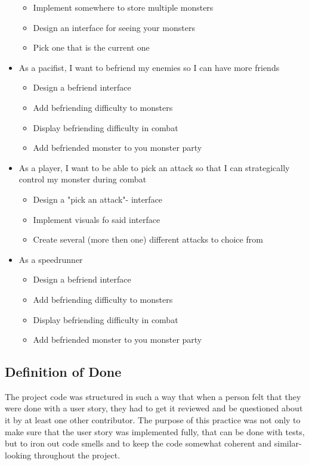 \begin{itemize}
	      \begin{itemize}[+]
		      \item Implement somewhere to store multiple monsters
		      \item Design an interface for seeing your monsters
		      \item Pick one that is the current one
	      \end{itemize}
	\item As a pacifist, I want to befriend my enemies so I can have more friends
	      \begin{itemize}[+]
		      \item Design a befriend interface
		      \item Add befriending difficulty to monsters
		      \item Display befriending difficulty in combat
		      \item Add befriended monster to you monster party
	      \end{itemize}
	\item As a player, I want to be able to pick an attack so that I can strategically control my monster during combat
	      \begin{itemize}[+]
		      \item Design a "pick an attack"- interface
		      \item Implement visuals fo said interface
		      \item Create several (more then one) different attacks to choice from
	      \end{itemize}
	\item As a speedrunner
	      \begin{itemize}[+]
		      \item Design a befriend interface
		      \item Add befriending difficulty to monsters
		      \item Display befriending difficulty in combat
		      \item Add befriended monster to you monster party
	      \end{itemize}
\end{itemize}



\subsection{Definition of Done}

The project code was structured in such a way that when a person felt that they were done with a user story, they had to get it reviewed and be questioned about it by at least one other contributor. The purpose of this practice was not only to make sure that the user story was implemented fully, that can be done with tests, but to iron out code smells and to keep the code somewhat coherent and similar-looking throughout the project.


